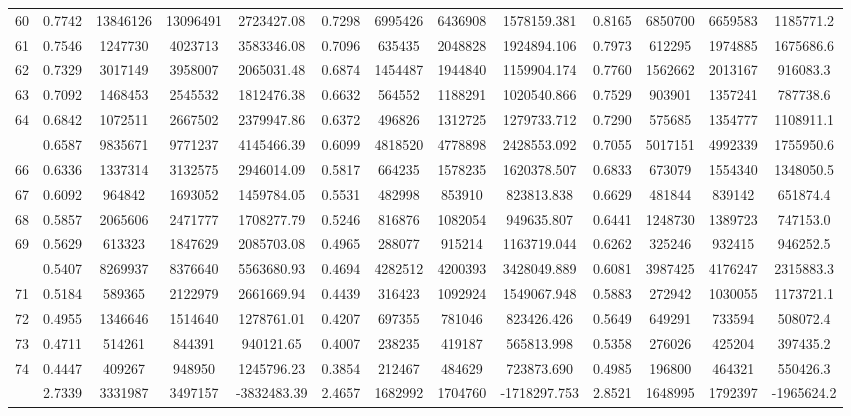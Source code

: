 \documentclass[
  12pt,
]{article}
\begin{document}
\begin{longtable}[t]{lcccccccccccc}
60 & 0.7742 & 13846126 & 13096491 & 2723427.08 & 0.7298 & 6995426 & 6436908 & 1578159.381 & 0.8165 & 6850700 & 6659583 & 1185771.2\\
61 & 0.7546 & 1247730 & 4023713 & 3583346.08 & 0.7096 & 635435 & 2048828 & 1924894.106 & 0.7973 & 612295 & 1974885 & 1675686.6\\
62 & 0.7329 & 3017149 & 3958007 & 2065031.48 & 0.6874 & 1454487 & 1944840 & 1159904.174 & 0.7760 & 1562662 & 2013167 & 916083.3\\
63 & 0.7092 & 1468453 & 2545532 & 1812476.38 & 0.6632 & 564552 & 1188291 & 1020540.866 & 0.7529 & 903901 & 1357241 & 787738.6\\
64 & 0.6842 & 1072511 & 2667502 & 2379947.86 & 0.6372 & 496826 & 1312725 & 1279733.712 & 0.7290 & 575685 & 1354777 & 1108911.1\\
\addlinespace
65 & 0.6587 & 9835671 & 9771237 & 4145466.39 & 0.6099 & 4818520 & 4778898 & 2428553.092 & 0.7055 & 5017151 & 4992339 & 1755950.6\\
66 & 0.6336 & 1337314 & 3132575 & 2946014.09 & 0.5817 & 664235 & 1578235 & 1620378.507 & 0.6833 & 673079 & 1554340 & 1348050.5\\
67 & 0.6092 & 964842 & 1693052 & 1459784.05 & 0.5531 & 482998 & 853910 & 823813.838 & 0.6629 & 481844 & 839142 & 651874.4\\
68 & 0.5857 & 2065606 & 2471777 & 1708277.79 & 0.5246 & 816876 & 1082054 & 949635.807 & 0.6441 & 1248730 & 1389723 & 747153.0\\
69 & 0.5629 & 613323 & 1847629 & 2085703.08 & 0.4965 & 288077 & 915214 & 1163719.044 & 0.6262 & 325246 & 932415 & 946252.5\\
\addlinespace
70 & 0.5407 & 8269937 & 8376640 & 5563680.93 & 0.4694 & 4282512 & 4200393 & 3428049.889 & 0.6081 & 3987425 & 4176247 & 2315883.3\\
71 & 0.5184 & 589365 & 2122979 & 2661669.94 & 0.4439 & 316423 & 1092924 & 1549067.948 & 0.5883 & 272942 & 1030055 & 1173721.1\\
72 & 0.4955 & 1346646 & 1514640 & 1278761.01 & 0.4207 & 697355 & 781046 & 823426.426 & 0.5649 & 649291 & 733594 & 508072.4\\
73 & 0.4711 & 514261 & 844391 & 940121.65 & 0.4007 & 238235 & 419187 & 565813.998 & 0.5358 & 276026 & 425204 & 397435.2\\
74 & 0.4447 & 409267 & 948950 & 1245796.23 & 0.3854 & 212467 & 484629 & 723873.690 & 0.4985 & 196800 & 464321 & 550426.3\\
\addlinespace
75 & 2.7339 & 3331987 & 3497157 & -3832483.39 & 2.4657 & 1682992 & 1704760 & -1718297.753 & 2.8521 & 1648995 & 1792397 & -1965624.2\\*
\end{longtable}
\endgroup{}
\end{document}
